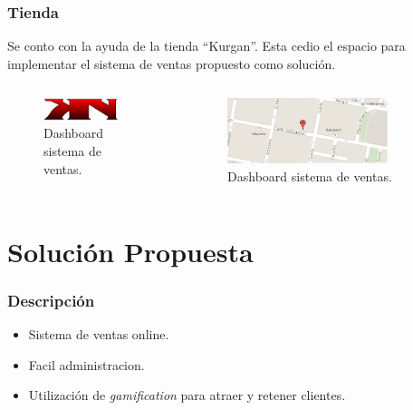 \documentclass[10pt, compress]{beamer}
\begin{document}
\begin{frame}
 \frametitle{Tienda}

Se conto con la ayuda de la tienda ``Kurgan''. Esta cedio el espacio para implementar el sistema de ventas 
propuesto como solución.

\begin{columns}[onlytextwidth]
\begin{figure}
\centering
    \includegraphics[width=0.8\textwidth]{images/logo.png}
    \caption{Dashboard sistema de ventas.}
    \label{fig:awesome_image}
\end{figure}

\begin{figure}
\centering
    \includegraphics[width=0.8\textwidth]{images/mapa.png}
    \caption{Dashboard sistema de ventas.}
    \label{fig:awesome_image}
\end{figure}

\end{columns}
\end{frame}

\section{Solución Propuesta}

\begin{frame}
 \frametitle{Descripción}

\begin{itemize}[<+- | alert@+>]
 \item Sistema de ventas online.
 \item Facil administracion.
 \item Utilización de \emph{gamification} para atraer y retener clientes.
\end{itemize}
\end{frame}
\end{document}
